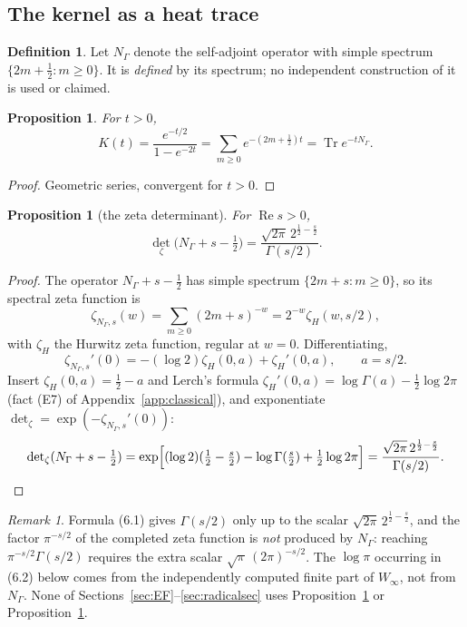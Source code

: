 \documentclass[11pt]{amsart}
\newtheorem{proposition}[theorem]{Proposition}
\theoremstyle{definition}
\newtheorem{definition}[theorem]{Definition}
\theoremstyle{remark}
\newtheorem{remark}[theorem]{Remark}
\newcommand{\Tr}{\operatorname{Tr}}
\newcommand{\Rel}{\operatorname{Re}}
\begin{document}
\subsection{The kernel as a heat trace}

\begin{definition}
\label{def:NGamma}
Let $N_\Gamma$ denote the self-adjoint operator with simple spectrum
$\{2m+\tfrac12: m\ge0\}$.  It is \emph{defined} by its spectrum; no independent
construction of it is used or claimed.
\end{definition}

\begin{proposition}
\label{prop:heattrace}
For $t>0$,
\[
  K(t)=\frac{e^{-t/2}}{1-e^{-2t}}=\sum_{m\ge0}e^{-(2m+\frac12)t}
  =\Tr e^{-tN_\Gamma}.
\]
\end{proposition}

\begin{proof}
Geometric series, convergent for $t>0$.
\end{proof}

\begin{proposition}[the zeta determinant]
\label{prop:zetadet}
For $\Rel s>0$,
\begin{equation}
  {\det}_\zeta\bigl(N_\Gamma+s-\tfrac12\bigr)
  =\frac{\sqrt{2\pi}\,2^{\frac12-\frac s2}}{\Gamma(s/2)} .
\tag{6.1}
\end{equation}
\end{proposition}

\begin{proof}
The operator $N_\Gamma+s-\tfrac12$ has simple spectrum $\{2m+s: m\ge0\}$, so
its spectral zeta function is
\[
  \zeta_{N_\Gamma,s}(w)=\sum_{m\ge0}(2m+s)^{-w}=2^{-w}\zeta_H(w,s/2),
\]
with $\zeta_H$ the Hurwitz zeta function, regular at $w=0$.  Differentiating,
\[
  \zeta_{N_\Gamma,s}'(0)=-(\log2)\zeta_H(0,a)+\zeta_H'(0,a),\qquad a=s/2 .
\]
Insert $\zeta_H(0,a)=\tfrac12-a$ and Lerch's formula
$\zeta_H'(0,a)=\log\Gamma(a)-\tfrac12\log2\pi$ (fact (E7) of
Appendix~\ref{app:classical}), and exponentiate
${\det}_\zeta=\exp(-\zeta_{N_\Gamma,s}'(0))$:
\[
  {\det}_\zeta(N_\Gamma+s-\tfrac12)
  =\exp\Bigl[(\log2)(\tfrac12-\tfrac s2)-\log\Gamma(\tfrac s2)+\tfrac12\log2\pi\Bigr]
  =\frac{\sqrt{2\pi}\,2^{\frac12-\frac s2}}{\Gamma(s/2)} .\qedhere
\]
\end{proof}

\begin{remark}
\label{rem:scope}
Formula (6.1) gives $\Gamma(s/2)$ only up to the scalar
$\sqrt{2\pi}\,2^{\frac12-\frac s2}$, and the factor $\pi^{-s/2}$ of the
completed zeta function is \emph{not} produced by $N_\Gamma$: reaching
$\pi^{-s/2}\Gamma(s/2)$ requires the extra scalar $\sqrt\pi\,(2\pi)^{-s/2}$.
The $\log\pi$ occurring in (6.2) below comes from the independently computed
finite part of $W_\infty$, not from $N_\Gamma$.  None of Sections~\ref{sec:EF}--\ref{sec:radicalsec} uses
Proposition~\ref{prop:heattrace} or Proposition~\ref{prop:zetadet}.
\end{remark}
\end{document}
